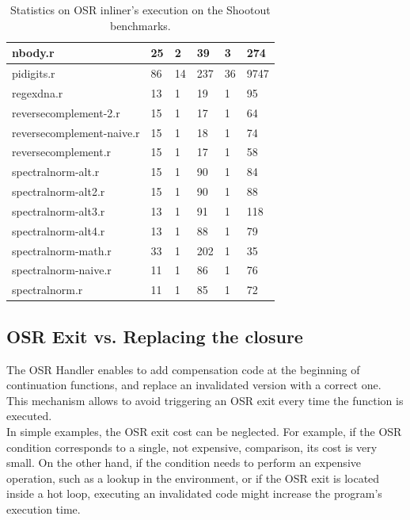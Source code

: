 \begin{table}[h!]
{\begin{tabular}{|l|l|l|l|l|l|}
nbody.r & 25 & 2 & 39 & 3 & 274\\ \hline
pidigits.r & 86 & 14 & 237 & 36 & 9747\\ \hline
regexdna.r & 13 & 1 & 19 & 1 & 95\\ \hline
reversecomplement-2.r & 15 & 1 & 17 & 1 & 64\\ \hline
reversecomplement-naive.r & 15 & 1 & 18 & 1 & 74\\ \hline
reversecomplement.r & 15 & 1 & 17 & 1 & 58\\ \hline
spectralnorm-alt.r & 15 & 1 & 90 & 1 & 84\\ \hline
spectralnorm-alt2.r & 15 & 1 & 90 & 1 & 88\\ \hline
spectralnorm-alt3.r & 13 & 1 & 91 & 1 & 118\\ \hline
spectralnorm-alt4.r & 13 & 1 & 88 & 1 & 79\\ \hline
spectralnorm-math.r & 33 & 1 & 202 & 1 & 35\\ \hline
spectralnorm-naive.r & 11 & 1 & 86 & 1 & 76\\ \hline
spectralnorm.r & 11 & 1 & 85 & 1 & 72\\ \hline

\end{tabular}}%
\caption{Statistics on OSR inliner's execution on the Shootout benchmarks.}
\label{tab:statsinliner}
\end{table}
\clearpage



\subsection{OSR Exit vs. Replacing the closure}\label{section:osrexitsvsreplacing}
The OSR Handler enables to add compensation code at the beginning of continuation functions, and replace an invalidated version with a correct one.
This mechanism allows to avoid triggering an OSR exit every time the function is executed.\\

In simple examples, the OSR exit cost can be neglected.
For example, if the OSR condition corresponds to a single, not expensive, comparison, its cost is very small.
On the other hand, if the condition needs to perform an expensive operation, such as a lookup in the environment, or if the OSR exit is located inside a hot loop, executing an invalidated code might increase the program's execution time.\\

